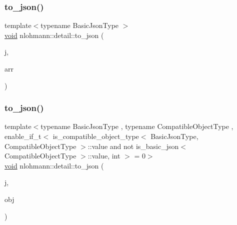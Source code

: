 \mbox{\label{namespacenlohmann_1_1detail_aa0fd1b5788e9ba37e31da43dda738cb5}} 
\subsubsection{\texorpdfstring{to\+\_\+json()}{to\_json()}\hspace{0.1cm}{\footnotesize\ttfamily [11/17]}}
{\footnotesize\ttfamily template$<$typename Basic\+Json\+Type $>$ \\
\hyperlink{namespacenlohmann_1_1detail_a59fca69799f6b9e366710cb9043aa77d}{void} nlohmann\+::detail\+::to\+\_\+json (\begin{DoxyParamCaption}\item[{Basic\+Json\+Type \&}]{j,  }\item[{typename Basic\+Json\+Type\+::array\+\_\+t \&\&}]{arr }\end{DoxyParamCaption})}

\mbox{\label{namespacenlohmann_1_1detail_a24c9c12f3839c94e09532f08de85e949}} 
\subsubsection{\texorpdfstring{to\+\_\+json()}{to\_json()}\hspace{0.1cm}{\footnotesize\ttfamily [12/17]}}
{\footnotesize\ttfamily template$<$typename Basic\+Json\+Type , typename Compatible\+Object\+Type , enable\+\_\+if\+\_\+t$<$ is\+\_\+compatible\+\_\+object\+\_\+type$<$ Basic\+Json\+Type, Compatible\+Object\+Type $>$\+::value and not is\+\_\+basic\+\_\+json$<$ Compatible\+Object\+Type $>$\+::value, int $>$  = 0$>$ \\
\hyperlink{namespacenlohmann_1_1detail_a59fca69799f6b9e366710cb9043aa77d}{void} nlohmann\+::detail\+::to\+\_\+json (\begin{DoxyParamCaption}\item[{Basic\+Json\+Type \&}]{j,  }\item[{const Compatible\+Object\+Type \&}]{obj }\end{DoxyParamCaption})}

